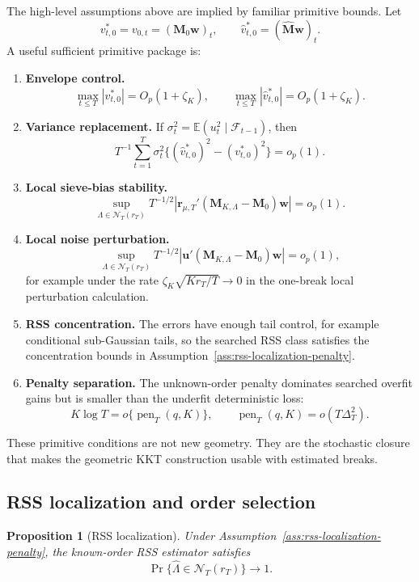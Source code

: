 \documentclass[12pt]{article}
\numberwithin{equation}{section}
\newtheorem{proposition}{Proposition}
\theoremstyle{definition}
\newcommand{\E}{\mathbb E}
\newcommand{\op}{o_p}
\newcommand{\Op}{O_p}
\begin{document}
The high-level assumptions above are implied by familiar primitive bounds. Let
\[
    v^*_{t,0}=v_{0,t}=(\bm M_0\bm w)_t,
    \qquad
    \widehat v^*_{t,0}=(\widehat{\bm M}\bm w)_t.
\]
A useful sufficient primitive package is:
\begin{enumerate}[leftmargin=2em]
\item \textbf{Envelope control.}
      \[
          \max_{t\le T}|v^*_{t,0}|=\Op(1+\zeta_K),
          \qquad
          \max_{t\le T}|\widehat v^*_{t,0}|=\Op(1+\zeta_K).
      \]
\item \textbf{Variance replacement.} If
      \(\sigma_t^2=\E(u_t^2\mid\mathcal F_{t-1})\), then
      \[
          T^{-1}\sum_{t=1}^T
          \sigma_t^2\{(\widehat v^*_{t,0})^2-(v^*_{t,0})^2\}=\op(1).
      \]
\item \textbf{Local sieve-bias stability.}
      \[
          \sup_{\Lambda\in\mathcal N_T(r_T)}
          T^{-1/2}|\bm r_{\mu,T}'(\bm M_{K,\Lambda}-\bm M_0)\bm w|=\op(1).
      \]
\item \textbf{Local noise perturbation.}
      \[
          \sup_{\Lambda\in\mathcal N_T(r_T)}
          T^{-1/2}|\bm u'(\bm M_{K,\Lambda}-\bm M_0)\bm w|=\op(1),
      \]
      for example under the rate \(\zeta_K\sqrt{Kr_T/T}\to0\) in the one-break
      local perturbation calculation.
\item \textbf{RSS concentration.} The errors have enough tail control, for
      example conditional sub-Gaussian tails, so the searched RSS class satisfies
      the concentration bounds in Assumption~\ref{ass:rss-localization-penalty}.
\item \textbf{Penalty separation.} The unknown-order penalty dominates searched
      overfit gains but is smaller than the underfit deterministic loss:
      \[
          K\log T=o\{\operatorname{pen}_T(q,K)\},
          \qquad
          \operatorname{pen}_T(q,K)=o(T\Delta_T^2).
      \]
\end{enumerate}
These primitive conditions are not new geometry. They are the stochastic closure
that makes the geometric KKT construction usable with estimated breaks.
\subsection{RSS localization and order selection}

\begin{proposition}[RSS localization]
\label{prop:part2-rss-localization}
Under Assumption~\ref{ass:rss-localization-penalty}, the known-order RSS
estimator satisfies
\[
    \Pr\{\widehat\Lambda\in\mathcal N_T(r_T)\}\to1.
\]
\end{proposition}
\end{document}
